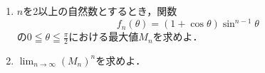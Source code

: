 \documentclass[../../main.tex]{subfiles}
\begin{document}
\begin{enumerate}
  \item$n$を2以上の自然数とするとき，関数
    \[ f_n(\theta)=(1+\cos\theta)\sin^{n-1}\theta \]
    の$\displaystyle 0 \leqq \theta \leqq \frac{\pi}{2}$における最大値$M_n$を求めよ．
  \item$\displaystyle\lim_{n\to\infty}{(M_n)}^n$を求めよ．
\end{enumerate}
\end{document}
